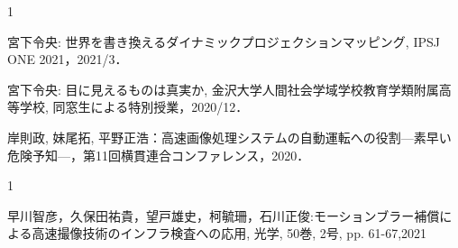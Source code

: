 \begin{招待講演}{1}

宮下令央: 世界を書き換えるダイナミックプロジェクションマッピング, IPSJ ONE 2021，2021/3．

宮下令央: 目に見えるものは真実か, 金沢大学人間社会学域学校教育学類附属高等学校, 同窓生による特別授業，2020/12．

岸則政, 妹尾拓, 平野正浩：高速画像処理システムの自動運転への役割—素早い危険予知—，第11回横貫連合コンファレンス，2020．


\end{招待講演}

\begin{招待論文}{1}

早川智彦，久保田祐貴，望戸雄史，柯毓珊，石川正俊:モーションブラー補償による高速撮像技術のインフラ検査への応用, 光学, 50巻, 2号, pp. 61-67,2021


\end{招待論文}

